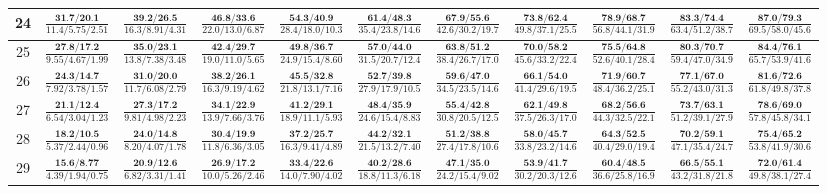 \documentclass{slides}
\begin{document}
{{{\begin{tabular}{|c|c|c|c|c|c|c|c|c|c|c|}
\hline
24 & $\frac{\textbf{31.7/20.1}}{11.4/5.75/2.51}$ & $\frac{\textbf{39.2/26.5}}{16.3/8.91/4.31}$ & $\frac{\textbf{46.8/33.6}}{22.0/13.0/6.87}$ & $\frac{\textbf{54.3/40.9}}{28.4/18.0/10.3}$ & $\frac{\textbf{61.4/48.3}}{35.4/23.8/14.6}$ & $\frac{\textbf{67.9/55.6}}{42.6/30.2/19.7}$ & $\frac{\textbf{73.8/62.4}}{49.8/37.1/25.5}$ & $\frac{\textbf{78.9/68.7}}{56.8/44.1/31.9}$ & $\frac{\textbf{83.3/74.4}}{63.4/51.2/38.7}$ & $\frac{\textbf{87.0/79.3}}{69.5/58.0/45.6}$ \\
\hline
25 & $\frac{\textbf{27.8/17.2}}{9.55/4.67/1.99}$ & $\frac{\textbf{35.0/23.1}}{13.8/7.38/3.48}$ & $\frac{\textbf{42.4/29.7}}{19.0/11.0/5.65}$ & $\frac{\textbf{49.8/36.7}}{24.9/15.4/8.60}$ & $\frac{\textbf{57.0/44.0}}{31.5/20.7/12.4}$ & $\frac{\textbf{63.8/51.2}}{38.4/26.7/17.0}$ & $\frac{\textbf{70.0/58.2}}{45.6/33.2/22.4}$ & $\frac{\textbf{75.5/64.8}}{52.6/40.1/28.4}$ & $\frac{\textbf{80.3/70.7}}{59.4/47.0/34.9}$ & $\frac{\textbf{84.4/76.1}}{65.7/53.9/41.6}$ \\
\hline
26 & $\frac{\textbf{24.3/14.7}}{7.92/3.78/1.57}$ & $\frac{\textbf{31.0/20.0}}{11.7/6.08/2.79}$ & $\frac{\textbf{38.2/26.1}}{16.3/9.19/4.62}$ & $\frac{\textbf{45.5/32.8}}{21.8/13.1/7.16}$ & $\frac{\textbf{52.7/39.8}}{27.9/17.9/10.5}$ & $\frac{\textbf{59.6/47.0}}{34.5/23.5/14.6}$ & $\frac{\textbf{66.1/54.0}}{41.4/29.6/19.5}$ & $\frac{\textbf{71.9/60.7}}{48.4/36.2/25.1}$ & $\frac{\textbf{77.1/67.0}}{55.2/43.0/31.3}$ & $\frac{\textbf{81.6/72.6}}{61.8/49.8/37.8}$ \\
\hline
27 & $\frac{\textbf{21.1/12.4}}{6.54/3.04/1.23}$ & $\frac{\textbf{27.3/17.2}}{9.81/4.98/2.23}$ & $\frac{\textbf{34.1/22.9}}{13.9/7.66/3.76}$ & $\frac{\textbf{41.2/29.1}}{18.9/11.1/5.93}$ & $\frac{\textbf{48.4/35.9}}{24.6/15.4/8.83}$ & $\frac{\textbf{55.4/42.8}}{30.8/20.5/12.5}$ & $\frac{\textbf{62.1/49.8}}{37.5/26.3/17.0}$ & $\frac{\textbf{68.2/56.6}}{44.3/32.5/22.1}$ & $\frac{\textbf{73.7/63.1}}{51.2/39.1/27.9}$ & $\frac{\textbf{78.6/69.0}}{57.8/45.8/34.1}$ \\
\hline
28 & $\frac{\textbf{18.2/10.5}}{5.37/2.44/0.96}$ & $\frac{\textbf{24.0/14.8}}{8.20/4.07/1.78}$ & $\frac{\textbf{30.4/19.9}}{11.8/6.36/3.05}$ & $\frac{\textbf{37.2/25.7}}{16.3/9.41/4.89}$ & $\frac{\textbf{44.2/32.1}}{21.5/13.2/7.40}$ & $\frac{\textbf{51.2/38.8}}{27.4/17.8/10.6}$ & $\frac{\textbf{58.0/45.7}}{33.8/23.2/14.6}$ & $\frac{\textbf{64.3/52.5}}{40.4/29.0/19.4}$ & $\frac{\textbf{70.2/59.1}}{47.1/35.4/24.7}$ & $\frac{\textbf{75.4/65.2}}{53.8/41.9/30.6}$ \\
\hline
29 & $\frac{\textbf{15.6/8.77}}{4.39/1.94/0.75}$ & $\frac{\textbf{20.9/12.6}}{6.82/3.31/1.41}$ & $\frac{\textbf{26.9/17.2}}{10.0/5.26/2.46}$ & $\frac{\textbf{33.4/22.6}}{14.0/7.90/4.02}$ & $\frac{\textbf{40.2/28.6}}{18.8/11.3/6.18}$ & $\frac{\textbf{47.1/35.0}}{24.2/15.4/9.02}$ & $\frac{\textbf{53.9/41.7}}{30.2/20.3/12.6}$ & $\frac{\textbf{60.4/48.5}}{36.6/25.8/16.9}$ & $\frac{\textbf{66.5/55.1}}{43.2/31.8/21.8}$ & $\frac{\textbf{72.0/61.4}}{49.8/38.1/27.4}$ \\

\end{tabular}}}}
\end{document}
